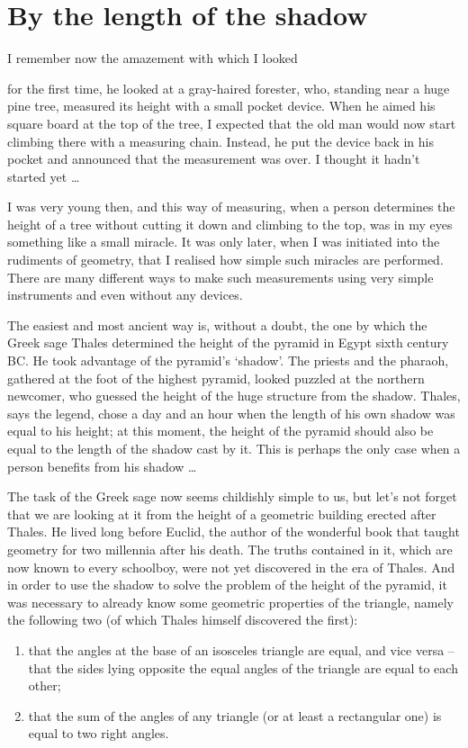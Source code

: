 \section{By the length of the shadow}
\label{sec-1.1}

I remember now the amazement with which I looked

for the first time, he looked at a gray-haired forester, who, standing near a huge pine tree, measured its height with a small pocket device. When he aimed his square board at the top of the tree, I expected that the old man would now start climbing there with a measuring chain. Instead, he put the device back in his pocket and announced that the measurement was over. I thought it hadn't started yet \ldots{}

I was very young then, and this way of measuring, when a person determines the height of a tree without cutting it down and climbing to the top, was in my eyes something like a small miracle. It was only later, when I was initiated into the rudiments of geometry, that I realised how simple such miracles are performed. There are many different ways to make such measurements using very simple instruments and even without any devices.

The easiest and most ancient way is, without a doubt, the one by which the Greek sage Thales determined the height of the pyramid in Egypt sixth century BC. He took advantage of the pyramid's `shadow'. The priests and the pharaoh, gathered at the foot of the highest pyramid, looked puzzled at the northern newcomer, who guessed the height of the huge structure from the shadow. Thales, says the legend, chose a day and an hour when the length of his own shadow was equal to his height; at this moment, the height of the pyramid should also be equal to the length of the shadow cast by it. This is perhaps the only case when a person benefits from his shadow \ldots{}

The task of the Greek sage now seems childishly simple to us, but let's not forget that we are looking at it from the height of a geometric building erected after Thales. He lived long before Euclid, the author of the wonderful book that taught geometry for two millennia after his death. The truths contained in it, which are now known to every schoolboy, were not yet discovered in the era of Thales. And in order to use the shadow to solve the problem of the height of the pyramid, it was necessary to already know some geometric properties of the triangle, namely the following two (of which Thales himself discovered the first):
\begin{enumerate}
\item that the angles at the base of an isosceles triangle are equal, and vice versa -- that the sides lying opposite the equal angles of the triangle are equal to each other;
\item that the sum of the angles of any triangle (or at least a rectangular one) is equal to two right angles.
\end{enumerate}

